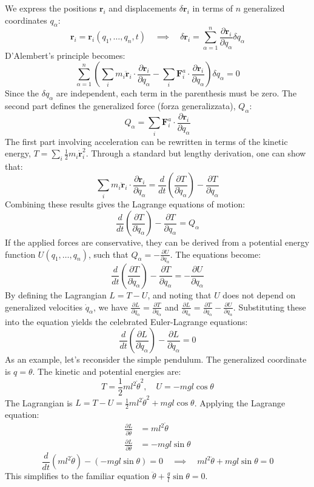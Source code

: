 We express the positions $\mathbf{r}_i$ and displacements $\delta\mathbf{r}_i$ in terms of $n$ generalized coordinates $q_\alpha$:
\[
    \mathbf{r}_i = \mathbf{r}_i(q_1, \dots, q_n, t) \quad \implies \quad \delta\mathbf{r}_i = \sum_{\alpha=1}^n \frac{\partial\mathbf{r}_i}{\partial q_\alpha}\delta q_\alpha
\]
D'Alembert's principle becomes:
\[
    \sum_{\alpha=1}^n \left( \sum_i m_i\ddot{\mathbf{r}}_i \cdot \frac{\partial\mathbf{r}_i}{\partial q_\alpha} - \sum_i \mathbf{F}_i^a \cdot \frac{\partial\mathbf{r}_i}{\partial q_\alpha} \right) \delta q_\alpha = 0
\]
Since the $\delta q_\alpha$ are independent, each term in the parenthesis must be zero. The second part defines the generalized force (forza generalizzata), $Q_\alpha$:
\[
    Q_\alpha = \sum_i \mathbf{F}_i^a \cdot \frac{\partial\mathbf{r}_i}{\partial q_\alpha}
\]
The first part involving acceleration can be rewritten in terms of the kinetic energy, $T = \sum_i \frac{1}{2}m_i\dot{\mathbf{r}}_i^2$. Through a standard but lengthy derivation, one can show that:
\[
    \sum_i m_i\ddot{\mathbf{r}}_i \cdot \frac{\partial\mathbf{r}_i}{\partial q_\alpha} = \frac{d}{dt}\left(\frac{\partial T}{\partial\dot{q}_\alpha}\right) - \frac{\partial T}{\partial q_\alpha}
\]
Combining these results gives the Lagrange equations of motion:
\[
    \frac{d}{dt}\left(\frac{\partial T}{\partial\dot{q}_\alpha}\right) - \frac{\partial T}{\partial q_\alpha} = Q_\alpha
\]
If the applied forces are conservative, they can be derived from a potential energy function $U(q_1, \dots, q_n)$, such that $Q_\alpha = -\frac{\partial U}{\partial q_\alpha}$. The equations become:
\[
    \frac{d}{dt}\left(\frac{\partial T}{\partial\dot{q}_\alpha}\right) - \frac{\partial T}{\partial q_\alpha} = -\frac{\partial U}{\partial q_\alpha}
\]
By defining the Lagrangian $L = T - U$, and noting that $U$ does not depend on generalized velocities $\dot{q}_\alpha$, we have $\frac{\partial L}{\partial\dot{q}_\alpha} = \frac{\partial T}{\partial\dot{q}_\alpha}$ and $\frac{\partial L}{\partial q_\alpha} = \frac{\partial T}{\partial q_\alpha} - \frac{\partial U}{\partial q_\alpha}$. Substituting these into the equation yields the celebrated Euler-Lagrange equations:
\[
    \frac{d}{dt}\left(\frac{\partial L}{\partial\dot{q}_\alpha}\right) - \frac{\partial L}{\partial q_\alpha} = 0
\]
As an example, let's reconsider the simple pendulum. The generalized coordinate is $q = \theta$. The kinetic and potential energies are:
\[
    T = \frac{1}{2}ml^2\dot{\theta}^2, \quad U = -mgl\cos\theta
\]
The Lagrangian is $L = T - U = \frac{1}{2}ml^2\dot{\theta}^2 + mgl\cos\theta$. Applying the Lagrange equation:
\begin{align*}
    \frac{\partial L}{\partial\dot{\theta}} &= ml^2\dot{\theta} \\
    \frac{\partial L}{\partial\theta} &= -mgl\sin\theta
\end{align*}
\[
    \frac{d}{dt}(ml^2\dot{\theta}) - (-mgl\sin\theta) = 0 \quad \implies \quad ml^2\ddot{\theta} + mgl\sin\theta = 0
\]
This simplifies to the familiar equation $\ddot{\theta} + \frac{g}{l}\sin\theta = 0$.

